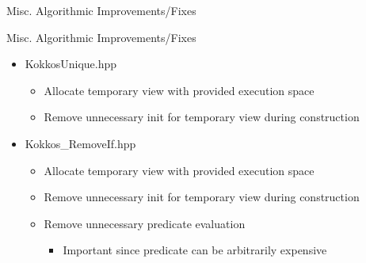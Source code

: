 
\begin{frame}[fragile]

  {\Huge Misc. Algorithmic Improvements/Fixes}

\end{frame}

\begin{frame}[fragile]{Misc. Algorithmic Improvements/Fixes}
\begin{itemize}
\item Kokkos\textunderscore Unique.hpp
\begin{itemize}
\item Allocate temporary view with provided execution space
\item Remove unnecessary init for temporary view during construction
\end{itemize}
\item Kokkos\_RemoveIf.hpp
\begin{itemize}
\item Allocate temporary view with provided execution space
\item Remove unnecessary init for temporary view during construction
\item Remove unnecessary predicate evaluation
\begin{itemize}
\item[] Important since predicate can be arbitrarily expensive
\end{itemize}
\end{itemize}
\end{itemize}
\end{frame}

